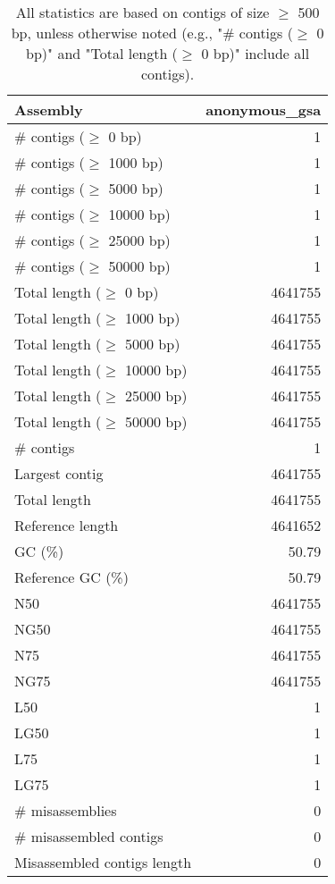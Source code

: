 \documentclass[12pt,a4paper]{article}
\begin{document}
\begin{table}[ht]
\begin{center}
\caption{All statistics are based on contigs of size $\geq$ 500 bp, unless otherwise noted (e.g., "\# contigs ($\geq$ 0 bp)" and "Total length ($\geq$ 0 bp)" include all contigs).}
\begin{tabular}{|l*{1}{|r}|}
\hline
Assembly & anonymous\_gsa \\ \hline
\# contigs ($\geq$ 0 bp) & 1 \\ \hline
\# contigs ($\geq$ 1000 bp) & 1 \\ \hline
\# contigs ($\geq$ 5000 bp) & 1 \\ \hline
\# contigs ($\geq$ 10000 bp) & 1 \\ \hline
\# contigs ($\geq$ 25000 bp) & 1 \\ \hline
\# contigs ($\geq$ 50000 bp) & 1 \\ \hline
Total length ($\geq$ 0 bp) & 4641755 \\ \hline
Total length ($\geq$ 1000 bp) & 4641755 \\ \hline
Total length ($\geq$ 5000 bp) & 4641755 \\ \hline
Total length ($\geq$ 10000 bp) & 4641755 \\ \hline
Total length ($\geq$ 25000 bp) & 4641755 \\ \hline
Total length ($\geq$ 50000 bp) & 4641755 \\ \hline
\# contigs & 1 \\ \hline
Largest contig & 4641755 \\ \hline
Total length & 4641755 \\ \hline
Reference length & 4641652 \\ \hline
GC (\%) & 50.79 \\ \hline
Reference GC (\%) & 50.79 \\ \hline
N50 & 4641755 \\ \hline
NG50 & 4641755 \\ \hline
N75 & 4641755 \\ \hline
NG75 & 4641755 \\ \hline
L50 & 1 \\ \hline
LG50 & 1 \\ \hline
L75 & 1 \\ \hline
LG75 & 1 \\ \hline
\# misassemblies & 0 \\ \hline
\# misassembled contigs & 0 \\ \hline
Misassembled contigs length & 0 \\ \hline

\end{tabular}
\end{center}
\end{table}
\end{document}

